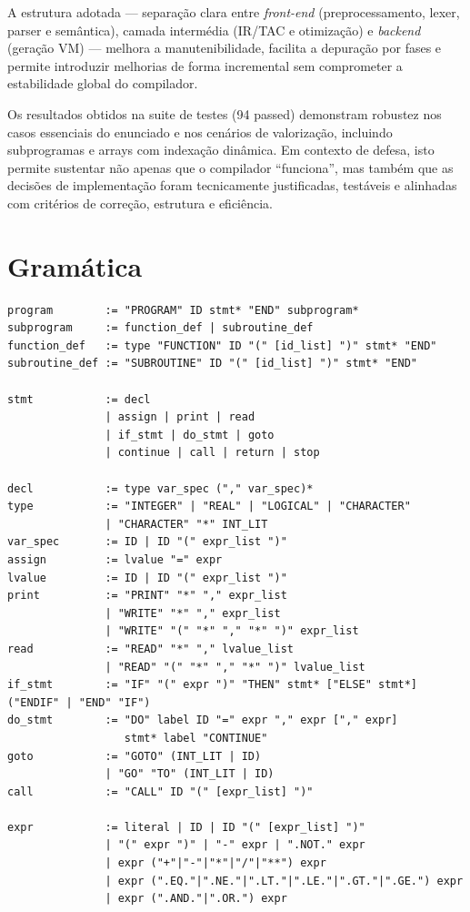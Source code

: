 \documentclass{article}
\renewcommand{\thesection}{\arabic{section}}
\begin{document}
A estrutura adotada --- separação clara entre \textit{front-end} (preprocessamento, lexer,
parser e semântica), camada intermédia (IR/TAC e otimização) e \textit{backend} (geração
VM) --- melhora a manutenibilidade, facilita a depuração por fases e permite introduzir
melhorias de forma incremental sem comprometer a estabilidade global do compilador.

Os resultados obtidos na suite de testes (94 passed) demonstram robustez nos casos
essenciais do enunciado e nos cenários de valorização, incluindo subprogramas e arrays com
indexação dinâmica. Em contexto de defesa, isto permite sustentar não apenas que o compilador
``funciona'', mas também que as decisões de implementação foram tecnicamente justificadas,
testáveis e alinhadas com critérios de correção, estrutura e eficiência.

\newpage
\appendix
\renewcommand{\thesection}{\Alph{section}}

\section{Gramática}
\label{anexo:gramatica}

\begin{verbatim}
program        := "PROGRAM" ID stmt* "END" subprogram*
subprogram     := function_def | subroutine_def
function_def   := type "FUNCTION" ID "(" [id_list] ")" stmt* "END"
subroutine_def := "SUBROUTINE" ID "(" [id_list] ")" stmt* "END"

stmt           := decl
               | assign | print | read
               | if_stmt | do_stmt | goto
               | continue | call | return | stop

decl           := type var_spec ("," var_spec)*
type           := "INTEGER" | "REAL" | "LOGICAL" | "CHARACTER"
               | "CHARACTER" "*" INT_LIT
var_spec       := ID | ID "(" expr_list ")"
assign         := lvalue "=" expr
lvalue         := ID | ID "(" expr_list ")"
print          := "PRINT" "*" "," expr_list
               | "WRITE" "*" "," expr_list
               | "WRITE" "(" "*" "," "*" ")" expr_list
read           := "READ" "*" "," lvalue_list
               | "READ" "(" "*" "," "*" ")" lvalue_list
if_stmt        := "IF" "(" expr ")" "THEN" stmt* ["ELSE" stmt*] ("ENDIF" | "END" "IF")
do_stmt        := "DO" label ID "=" expr "," expr ["," expr]
                  stmt* label "CONTINUE"
goto           := "GOTO" (INT_LIT | ID)
               | "GO" "TO" (INT_LIT | ID)
call           := "CALL" ID "(" [expr_list] ")"

expr           := literal | ID | ID "(" [expr_list] ")"
               | "(" expr ")" | "-" expr | ".NOT." expr
               | expr ("+"|"-"|"*"|"/"|"**") expr
               | expr (".EQ."|".NE."|".LT."|".LE."|".GT."|".GE.") expr
               | expr (".AND."|".OR.") expr
\end{verbatim}
\end{document}
